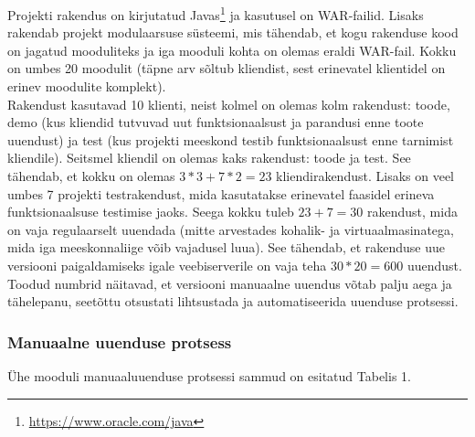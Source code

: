 \documentclass[12pt]{report}
\begin{document}
  Projekti rakendus on kirjutatud Javas\footnote{\url{https://www.oracle.com/java}} ja kasutusel on WAR\--failid. Lisaks rakendab projekt modulaarsuse süsteemi, mis tähendab, et kogu rakenduse kood on jagatud mooduliteks ja iga mooduli kohta on olemas eraldi WAR\--fail. Kokku on umbes 20 moodulit (täpne arv sõltub kliendist, sest erinevatel klientidel on erinev moodulite komplekt).\\
  
  Rakendust kasutavad 10 klienti, neist kolmel on olemas kolm rakendust: toode, demo (kus kliendid tutvuvad uut funktsionaalsust ja parandusi enne toote uuendust) ja test (kus projekti meeskond testib funktsionaalsust enne tarnimist kliendile). Seitsmel kliendil on olemas kaks rakendust: toode ja test. See tähendab, et kokku on olemas $3*3+7*2=23$ kliendirakendust. Lisaks on veel umbes 7 projekti testrakendust, mida kasutatakse erinevatel faasidel erineva funktsionaalsuse testimise jaoks. Seega kokku tuleb $23+7=30$ rakendust, mida on vaja regulaarselt uuendada (mitte arvestades kohalik\-- ja virtuaalmasinatega, mida iga meeskonnaliige võib vajadusel luua). See tähendab, et rakenduse uue versiooni paigaldamiseks igale veebiserverile on vaja teha $30*20=600$ uuendust.\\
  
  Toodud numbrid näitavad, et versiooni manuaalne uuendus võtab palju aega ja tähelepanu, seetõttu otsustati lihtsustada ja automatiseerida uuenduse protsessi.
  
  \newpage
  \subsubsection{Manuaalne uuenduse protsess}
  
  Ühe mooduli manuaaluuenduse protsessi sammud on esitatud Tabelis 1.
  
\end{document}
